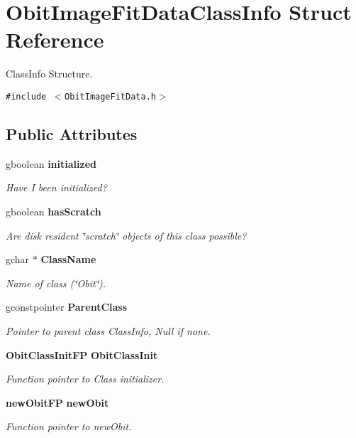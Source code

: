 \section{Obit\-Image\-Fit\-Data\-Class\-Info Struct Reference}
\label{structObitImageFitDataClassInfo}
Class\-Info Structure.  


{\tt \#include $<$Obit\-Image\-Fit\-Data.h$>$}

\subsection*{Public Attributes}
\begin{CompactItemize}
\item 
gboolean {\bf initialized}
\begin{CompactList}\small\item\em Have I been initialized? \item\end{CompactList}\item 
gboolean {\bf has\-Scratch}
\begin{CompactList}\small\item\em Are disk resident \char`\"{}scratch\char`\"{} objects of this class possible? \item\end{CompactList}\item 
gchar $\ast$ {\bf Class\-Name}
\begin{CompactList}\small\item\em Name of class (\char`\"{}Obit\char`\"{}). \item\end{CompactList}\item 
gconstpointer {\bf Parent\-Class}
\begin{CompactList}\small\item\em Pointer to parent class Class\-Info, Null if none. \item\end{CompactList}\item 
{\bf Obit\-Class\-Init\-FP} {\bf Obit\-Class\-Init}
\begin{CompactList}\small\item\em Function pointer to Class initializer. \item\end{CompactList}\item 
{\bf new\-Obit\-FP} {\bf new\-Obit}
\begin{CompactList}\small\item\em Function pointer to new\-Obit. \item\end{CompactList}\item 

\end{CompactItemize}
